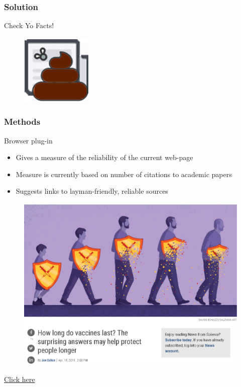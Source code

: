 \documentclass{beamer}
\begin{document}

\begin{frame} \frametitle{Solution}
	\centering
	\Huge Check Yo Facts!
	\vfill
	\begin{figure}
		\includegraphics[scale=3]{Figures/icon.png}
	\end{figure}
\end{frame}


\begin{frame} \frametitle{Methods}
	Browser plug-in
	\begin{itemize}
	    \item Gives a measure of the reliability of the current web-page
	    \item Measure is currently based on number of citations to academic papers
	    \item Suggests links to layman-friendly, reliable sources
	\end{itemize}
	\begin{figure}
		\includegraphics[scale=0.2]{Figures/webpage.pdf}
	\end{figure}
	\centering
	\href{https://www.sciencemag.org/news/2019/04/how-long-do-vaccines-last-surprising-answers-may-help-protect-people-longer?fbclid=IwAR2SRI_3p9j4aUWZDTyfPYf21PUJtjwojyErQg5rbUd3S-2MSFwjSxR9kfo}{Click here}
\end{frame}
\end{document}
